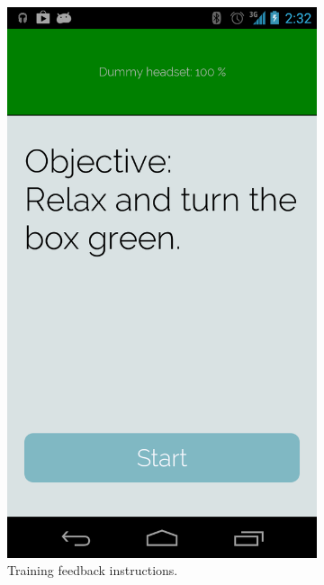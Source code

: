 \documentclass[a4paper,10pt,english,lof,lot,twoside]{puthesis}
\begin{document}
\begin{figure}
\begin{subfigure}[t]{0.30\linewidth}
\includegraphics[width=0.800\linewidth]{final-prototype-training-start.png}
\caption[Training feedback instructions]{Training feedback instructions.}\label{ch-design/index:fig-final-prototype-app-flow-training-start}\end{subfigure}
\begin{subfigure}[t]{0.30\linewidth}
\centering
\capstart


\end{subfigure}
\end{figure}
\end{document}
